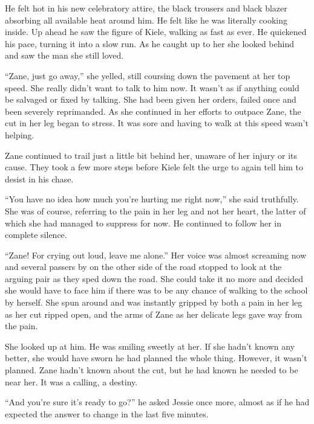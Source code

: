 \thoughtbreak



He felt hot in his new celebratory attire, the black trousers and black blazer absorbing all available heat around him.  He felt like he was literally cooking inside.  Up ahead he saw the figure of Kiele, walking as fast as ever.  He quickened his pace, turning it into a slow run.  As he caught up to her she looked behind and saw the man she still loved.

``Zane, just go away,'' she yelled, still coursing down the pavement at her top speed.  She really didn't want to talk to him now.  It wasn't as if anything could be salvaged or fixed by talking.  She had been given her orders, failed once and been severely reprimanded.  As she continued in her efforts to outpace Zane, the cut in her leg began to stress.  It was sore and having to walk at this speed wasn't helping.  

Zane continued to trail just a little bit behind her, unaware of her injury or its cause.  They took a few more steps before Kiele felt the urge to again tell him to desist in his chase.

``You have no idea how much you're hurting me right now,'' she said truthfully.  She was of course, referring to the pain in her leg and not her heart, the latter of which she had managed to suppress for now.  He continued to follow her in complete silence.  

``Zane! For crying out loud, leave me alone.''  Her voice was almost screaming now and several passers by on the other side of the road stopped to look at the arguing pair as they sped down the road.  She could take it no more and decided she would have to face him if there was to be any chance of walking to the school by herself.  She spun around and was instantly gripped by both a pain in her leg as her cut ripped open, and the arms of Zane as her delicate legs gave way from the pain.  

She looked up at him.  He was smiling sweetly at her.  If she hadn't known any better, she would have sworn he had planned the whole thing.  However, it wasn't planned.  Zane hadn't known about the cut, but he had known he needed to be near her.  It was a calling, a destiny.  



\thoughtbreak



``And you're sure it's ready to go?'' he asked Jessie once more, almost as if he had expected the answer to change in the last five minutes.  

